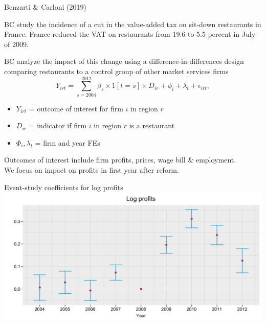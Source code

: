 \documentclass[aspectratio = 169, 13pt]{beamer}
\begin{document}
\begin{frame}{Benzarti \& Carloni (2019)}
	\begin{wideitemize}
		\item
		BC study the incidence of a cut in the value-added tax on sit-down restaurants in France.
		France reduced the VAT on restaurants from 19.6 to 5.5 percent in July of 2009. 
		
		\item
		BC analyze the impact of this change using a difference-in-differences design comparing restaurants to a control group of other market services firms
		\vspace{-3mm}
		\begin{equation}
			Y_{irt} = \sum_{s = 2004}^{2012} \beta_s \times 1[t = s] \times  D_{ir} + \phi_i + \lambda_t + \epsilon_{irt} , \label{eqn: bc event-study spec}    
		\end{equation}
		\vspace{-3mm}
		\noindent 
    \begin{itemize}
      \item $Y_{irt}$ = outcome of interest for firm $i$ in region $r$
      \item $D_{ir}$ = indicator if firm $i$ in region $r$ is a restaurant
      \item $\Phi_i, \lambda_t$ = firm and year FEs
		\end{itemize}
		
		\item Outcomes of interest include firm profits, prices, wage bill \& employment.\\
		We focus on impact on profits in first year after reform.
	\end{wideitemize}
\end{frame}

\begin{frame}{Event-study coefficients for log profits}
	\centering
	\includegraphics[width = 0.8 \textwidth]{figures/Benzarti-Carloni/profits-event-study.png}
\end{frame}
\end{document}
